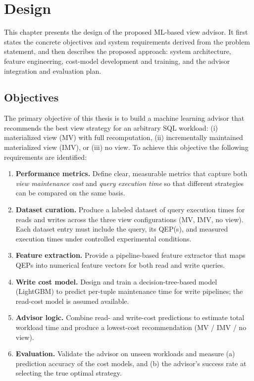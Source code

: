 \chapter{Design}
\label{chap:design}

This chapter presents the design of the proposed ML-based view advisor. It first states the concrete objectives and system requirements derived from the problem statement, and then describes the proposed approach: system architecture, feature engineering, cost-model development and training, and the advisor integration and evaluation plan.

\section{Objectives}
\label{sec:requirements}
The primary objective of this thesis is to build a machine learning advisor that recommends the best view strategy for an arbitrary SQL workload: (i) materialized view (MV) with full recomputation, (ii) incrementally maintained materialized view (IMV), or (iii) no view. To achieve this objective the following requirements are identified:

\begin{enumerate}
    \item \textbf{Performance metrics.} Define clear, measurable metrics that capture both \emph{view maintenance cost} and \emph{query execution time} so that different strategies can be compared on the same basis.
    \item \textbf{Dataset curation.} Produce a labeled dataset of query execution times for reads and writes across the three view configurations (MV, IMV, no view). Each dataset entry must include the query, its QEP(s), and measured execution times under controlled experimental conditions.
    \item \textbf{Feature extraction.} Provide a pipeline-based feature extractor that maps QEPs into numerical feature vectors for both read and write queries.
    \item \textbf{Write cost model.} Design and train a decision-tree-based model (LightGBM) to predict per-tuple maintenance time for write pipelines; the read-cost model is assumed available.
    \item \textbf{Advisor logic.} Combine read- and write-cost predictions to estimate total workload time and produce a lowest-cost recommendation (MV / IMV / no view).
    \item \textbf{Evaluation.} Validate the advisor on unseen workloads and measure (a) prediction accuracy of the cost models, and (b) the advisor's success rate at selecting the true optimal strategy.
\end{enumerate}

